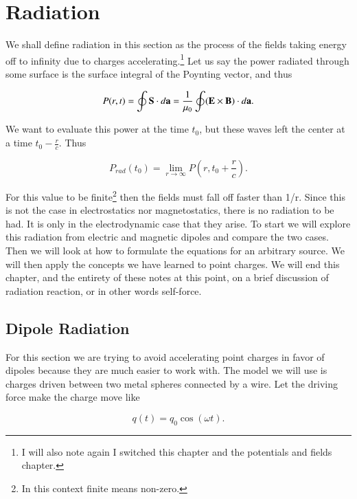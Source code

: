\documentclass[preprint, review,12pt]{elsarticle}
\def\x{\times}
\def\.{\cdot}
\def\b{\textbf}
\def\9{\left(}
\def\0{\right)}
\begin{document}
\section{Radiation}

We shall define radiation in this section as the process of the fields taking energy off to infinity due to charges accelerating.\footnote{I will also note again I switched this chapter and the potentials and fields chapter.} Let us say the power radiated through some surface is the surface integral of the Poynting vector, and thus

\begin{equation}
    P(r,t) = \oint \b S \. d \b a = \frac{1}{\mu_0} \oint (\b E \x \b B) \. d\b a.
\end{equation}

We want to evaluate this power at the time $t_0$, but these waves left the center at a time $t_0 - \frac{r}{c}$. Thus 

\begin{equation}
    P_{rad}(t_0) = \lim_{r\to\infty} P \9 r, t_0 + \frac{r}{c} \0.
\end{equation}

For this value to be finite\footnote{In this context finite means non-zero.} then the fields must fall off faster than 1/r. Since this is not the case in electrostatics nor magnetostatics, there is no radiation to be had. It is only in the electrodynamic case that they arise. To start we will explore this radiation from electric and magnetic dipoles and compare the two cases. Then we will look at how to formulate the equations for an arbitrary source. We will then apply the concepts we have learned to point charges. We will end this chapter, and the entirety of these notes at this point, on a brief discussion of radiation reaction, or in other words self-force.

\subsection{Dipole Radiation}

For this section we are trying to avoid accelerating point charges in favor of dipoles because they are much easier to work with. The model we will use is charges driven between two metal spheres connected by a wire. Let the driving force make the charge move like

\begin{equation}
    q(t) = q_0 \cos(\omega t).
\end{equation}
\end{document}

